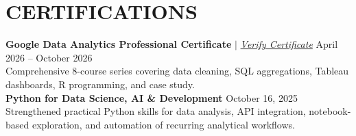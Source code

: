 \documentclass[letterpaper,10pt]{article}
\begin{document}
\section{CERTIFICATIONS}
\small
\noindent\textbf{Google Data Analytics Professional Certificate} $|$ \href{https://coursera.org/verify/professional-cert/QAFRHC32BBTU}{\textit{\color{primary}Verify Certificate}} \hfill \color{subtext}April 2026 -- October 2026\color{bodytext} \\
Comprehensive 8-course series covering data cleaning, SQL aggregations, Tableau dashboards, R programming, and case study. \\[3pt]
\noindent\textbf{Python for Data Science, AI \& Development} \hfill \color{subtext}October 16, 2025\color{bodytext} \\
Strengthened practical Python skills for data analysis, API integration, notebook-based exploration, and automation of recurring analytical workflows.
\end{document}
